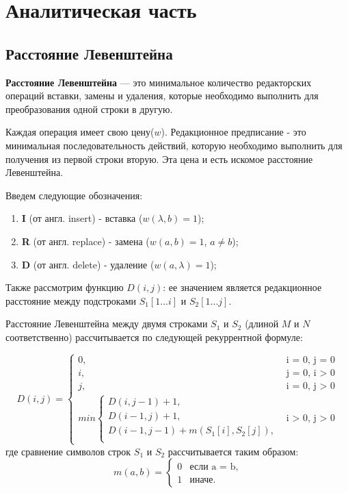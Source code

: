 \chapter{Аналитическая часть}
\section{Расстояние Левенштейна}

\textbf{Расстояние Левенштейна}\cite{levenshtein}  --- это минимальное количество редакторских операций вставки, замены и удаления, которые необходимо выполнить для преобразования одной строки в другую. 

Каждая операция имеет свою цену($w$). Редакционное предписание - это минимальная последовательность действий, которую необходимо выполнить для получения из первой строки вторую. Эта цена и есть искомое расстояние Левенштейна.

Введем следующие обозначения:
\begin{enumerate}[label=\arabic*)]
        \item \textbf{I} (от англ. insert) - вставка ($w(\lambda, b) = 1$);
        \item \textbf{R} (от англ. replace) - замена ($w(a, b) = 1$, $a \neq b$);
        \item \textbf{D} (от англ. delete) - удаление ($w(a, \lambda) = 1$);
\end{enumerate}

Также рассмотрим функцию $D(i, j)$: ее значением является
редакционное расстояние между подстроками $S_1[1...i]$ и $S_2[1...j]$.

Расстояние Левенштейна между двумя строками $S_{1}$ и $S_{2}$ (длиной $M$ и $N$ соответственно) рассчитывается по следующей рекуррентной формуле:

\begin{equation}
	\label{eq:L}
	D(i, j) =
	\begin{cases}
		0, &\text{i = 0, j = 0}\\
		i, &\text{j = 0, i > 0}\\
		j, &\text{i = 0, j > 0}\\
		min \begin{cases}
			D(i, j - 1) + 1,\\
			D(i - 1, j) + 1,\\
			D(i - 1, j - 1) +  m(S_{1}[i], S_{2}[j]), \\
		\end{cases}
		&\text{i > 0, j > 0}
	\end{cases}
\end{equation}
где сравнение символов строк $S_1$ и $S_2$ рассчитывается таким образом:
\begin{equation}
	\label{eq:m}
	m(a, b) = \begin{cases}
		0 &\text{если a = b,}\\
		1 &\text{иначе.}
	\end{cases}
\end{equation}

